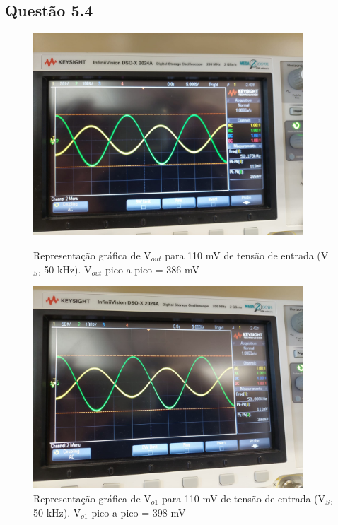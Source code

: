 \documentclass[a4paper,12pt]{article}
\begin{document}
			\clearpage
			\subsection{Questão 5.4}
					\begin{figure}[H]
    					\centering
    					\begin{minipage}[t]{0.45\textwidth}
        					\centering
        					\includegraphics[width=0.9\textwidth]{5.4-1.jpeg} %
        					\caption{Representação gráfica de V$_{out}$ para 110 mV de tensão de entrada (V$_S$, 50 kHz). V$_{out}$ pico a pico = 386 mV}
    					\end{minipage}\hfill
    					\begin{minipage}[t]{0.45\textwidth}
        					\centering
        					\includegraphics[width=0.9\textwidth]{5.4-2.jpeg} %
        					\caption{Representação gráfica de V$_{o1}$ para 110 mV de tensão de entrada (V$_S$, 50 kHz). V$_{o1}$ pico a pico = 398 mV}
    						\end{minipage}
				\end{figure}
				
\end{document}

